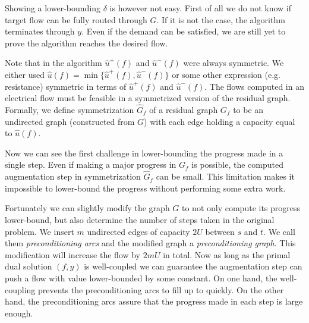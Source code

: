Showing a lower-bounding $\delta$ is however not easy. First of all we do not know if target flow can be fully routed through $G$. If it is not the case, the algorithm terminates through $y$. Even if the demand can be satisfied, we are still yet to prove the algorithm reaches the desired flow.

Note that in the algorithm $\hat u^+(f)$ and $\hat u^-(f)$ were always symmetric. We either used $\hat u(f)=\min\{\hat u^+(f), \hat u^-(f)\}$ or some other expression (e.g. resistance) symmetric in terms of $\hat u^+(f)$ and $\hat u^-(f)$. The flows computed in an electrical flow must be feasible in a symmetrized version of the residual graph.\\
Formally, we define symmetrization $\hat G_f$ of a residual graph $G_f$ to be an undirected graph (constructed from $G$) with each edge holding a capacity equal to $\hat u(f)$.

Now we can see the first challenge in lower-bounding the progress made in a single step. Even if making a major progress in $G_f$ is possible, the computed augmentation step in symmetrization $\hat G_f$ can be small. This limitation makes it impossible to lower-bound the progress without performing some extra work.

Fortunately we can slightly modify the graph $G$ to not only compute its progress lower-bound, but also determine the number of steps taken in the original problem.
We insert $m$ undirected edges of capacity $2U$ between $s$ and $t$.
We call them \textit{preconditioning arcs} and the modified graph a \textit{preconditioning graph}.
This modification will increase the flow by $2mU$ in total.
Now as long as the primal dual solution $(f,y)$ is well-coupled we can guarantee the augmentation step can push a flow with value lower-bounded by some constant.
On one hand, the well-coupling prevents the preconditioning arcs to fill up to quickly. On the other hand, the preconditioning arcs assure that the progress made in each step is large enough.

